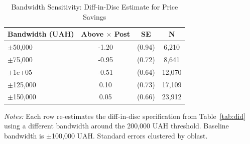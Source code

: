 \begin{table}[htbp]
\centering
\caption{Bandwidth Sensitivity: Diff-in-Disc Estimate for Price Savings}
\label{tab:bw}
\begin{tabular}{lccc}
\toprule
Bandwidth (UAH) & Above $\times$ Post & SE & N \\
\midrule
$\pm$50,000 & -1.20 & (0.94) & 6,210 \\
$\pm$75,000 & -0.95 & (0.72) & 8,641 \\
$\pm$1e+05 & -0.51 & (0.64) & 12,070 \\
$\pm$125,000 & 0.10 & (0.73) & 17,109 \\
$\pm$150,000 & 0.05 & (0.66) & 23,912 \\
\bottomrule
\end{tabular}
\begin{tablenotes}[flushleft]
\small
\item \textit{Notes:} Each row re-estimates the diff-in-disc specification from Table~\ref{tab:did} using a different bandwidth around the 200,000 UAH threshold. Baseline bandwidth is $\pm$100,000 UAH. Standard errors clustered by oblast.
\end{tablenotes}
\end{table}
